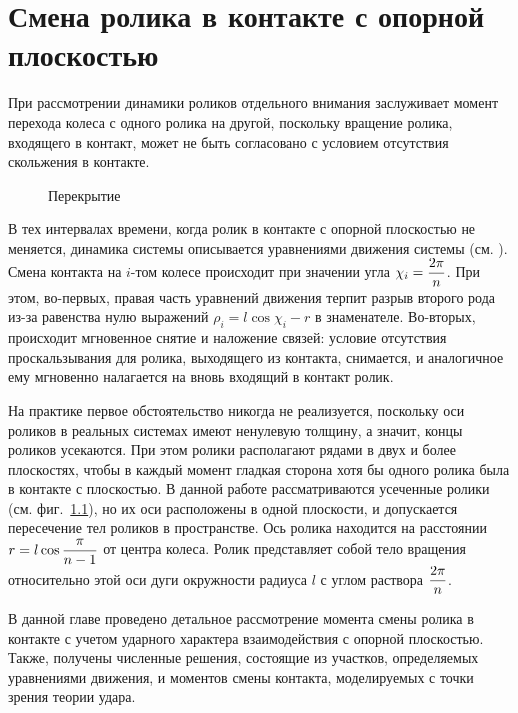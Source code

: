 \chapter{Смена ролика в контакте с опорной плоскостью}

При рассмотрении динамики роликов отдельного внимания заслуживает момент перехода колеса с одного ролика на другой, поскольку вращение ролика, входящего в контакт, может не быть согласовано с условием отсутствия скольжения в контакте.

\begin{figure}
    \minipage{\textwidth}
        \centering
        \caption{Перекрытие}
        \label{fig:overlap}
    \endminipage
\end{figure}

В тех интервалах времени, когда ролик в контакте с опорной плоскостью не меняется, динамика системы описывается уравнениями движения системы (см. \cite{GerasimovZobovaPMM2018}). Смена контакта на $i$-том колесе происходит при значении угла $\chi_i = \displaystyle\frac{\displaystyle 2\pi}{\displaystyle n}$. При этом, во-первых, правая часть уравнений движения терпит разрыв второго рода из-за равенства нулю выражений $\rho_i = l\cos\chi_i-r$ в знаменателе. Во-вторых, происходит мгновенное снятие и наложение связей: условие отсутствия проскальзывания для ролика, выходящего из контакта, снимается, и аналогичное ему мгновенно налагается на вновь входящий в контакт ролик.

На практике первое обстоятельство никогда не реализуется, поскольку оси роликов в реальных системах имеют ненулевую толщину, а значит, концы роликов усекаются. При этом ролики располагают рядами в двух и более плоскостях, чтобы в каждый момент гладкая сторона хотя бы одного ролика была в контакте с плоскостью. В данной работе рассматриваются усеченные ролики (см. фиг.~\ref{fig:overlap}), но их оси расположены в одной плоскости, и допускается пересечение тел роликов в пространстве. Ось ролика находится на расстоянии $r = l\cos\displaystyle\frac{\displaystyle \pi}{\displaystyle n-1}$ от центра колеса. Ролик представляет собой тело вращения относительно этой оси дуги окружности радиуса $l$ с углом раствора $\displaystyle\frac{\displaystyle 2\pi}{\displaystyle n}$.

В данной главе проведено детальное рассмотрение момента смены ролика в контакте с учетом ударного характера взаимодействия с опорной плоскостью. Также, получены численные решения, состоящие из участков, определяемых уравнениями движения, и моментов смены контакта, моделируемых с точки зрения теории удара.

